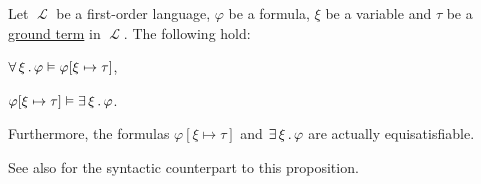 \begin{proposition}\label{thm:quantifier_satisfiability}
  Let \( \mscrL \) be a first-order language, \( \varphi \) be a formula, \( \xi \) be a variable and \( \tau \) be a \hyperref[def:first_order_syntax/ground_term]{ground term} in \( \mscrL \). The following hold:

  \begin{thmenum}
     \( \forall \thinspace \xi \thinspace . \thinspace \varphi \vDash \varphi[\xi \mapsto \tau] \),

     \( \varphi[\xi \mapsto \tau] \vDash \exists \thinspace \xi \thinspace . \thinspace \varphi \).

    Furthermore, the formulas \( \varphi[\xi \mapsto \tau] \) and \( \exists \thinspace \xi \thinspace . \thinspace \varphi \) are actually equisatisfiable.
  \end{thmenum}

  See also  for the syntactic counterpart to this proposition.
\end{proposition}
